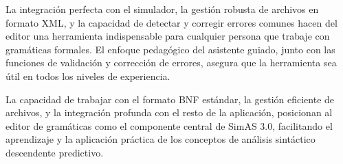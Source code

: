 La integración perfecta con el simulador, la gestión robusta de archivos en formato XML, y la capacidad de detectar y corregir errores comunes hacen del editor una herramienta indispensable para cualquier persona que trabaje con gramáticas formales. El enfoque pedagógico del asistente guiado, junto con las funciones de validación y corrección de errores, asegura que la herramienta sea útil en todos los niveles de experiencia.

La capacidad de trabajar con el formato BNF estándar, la gestión eficiente de archivos, y la integración profunda con el resto de la aplicación, posicionan al editor de gramáticas como el componente central de SimAS 3.0, facilitando el aprendizaje y la aplicación práctica de los conceptos de análisis sintáctico descendente predictivo.
